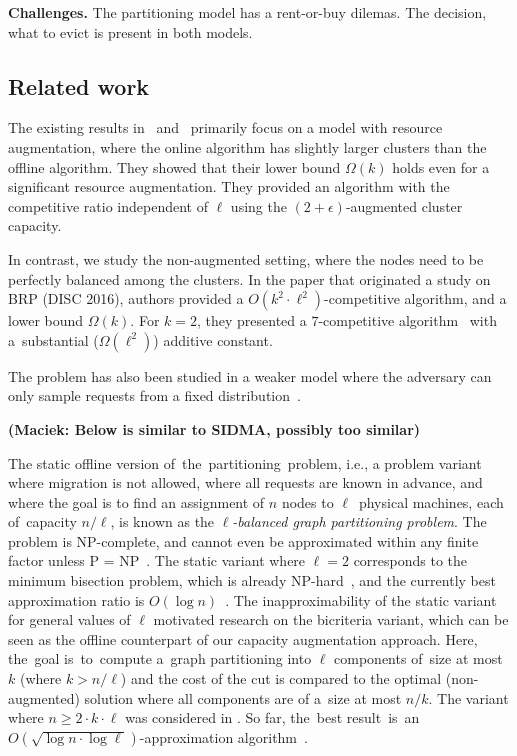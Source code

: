 \documentclass[manuscript,screen=true, review, anonymous]{acmart}
\newcommand\maciek[1]{\color{brown}\textbf{(Maciek: #1)}\color{black}}
\begin{document}
\noindent
\textbf{Challenges.}
The partitioning model has a rent-or-buy dilemas. The decision, what to evict is present in both models.



\subsection{Related work}


The existing results in~\cite{repartition-disc} and~\cite{sigmetrics19_partitioning} primarily focus on a model with resource augmentation, where  the online algorithm has slightly larger clusters than the offline algorithm.
They showed that their lower bound $\Omega(k)$ holds even for a significant resource augmentation.
They provided an algorithm with the competitive ratio independent of $\ell$ using the $(2+\epsilon)$-augmented cluster capacity.


In contrast, we study the non-augmented setting, where the nodes need to be perfectly balanced  among the clusters.
In the paper that originated a study on BRP \cite{repartition-disc} (DISC 2016), authors provided a $O(k^2 \cdot \ell^2)$-competitive algorithm, and a lower bound $\Omega(k)$.
For $k=2$, they presented a $7$-competitive algorithm~\cite{repartition-disc} with a~substantial ($\Omega(\ell^2)$) additive constant.


The problem has also been studied in a weaker
model where the adversary can only sample
requests from a fixed distribution~\cite{stochastic-ring}.

\maciek{Below is similar to SIDMA, possibly too similar}

The static offline version of~the~partitioning~problem, i.e., a problem variant where
migration is not allowed, where all requests are known in advance, and where
the goal is to find an assignment of $n$ nodes to $\ell$~physical machines, each of~capacity $n/\ell$, is known as the
\emph{$\ell$-balanced graph partitioning problem}. The problem is 
NP-complete, and cannot even be approximated within any finite factor unless P
= NP~\cite{AndRae06}.  The static
variant where $\ell = 2$ corresponds to the minimum bisection problem, which
is already NP-hard~\cite{GaJoSt76}, and 
the currently best approximation ratio is $O(\log n)$~\cite{SarVaz95,ArKaKa99,FeKrNi00,FeiKra02,KraFei06,Raec08}.
The inapproximability of the static variant for general values of $\ell$
motivated research on the bicriteria variant, which can be seen as the offline
counterpart of our capacity augmentation approach. Here, the~goal
is~to~compute a~graph partitioning into $\ell$ components of~size at most~$k$ (where $k > n/\ell$) and the cost of the cut is compared to the optimal (non-augmented)
solution where all components are of a~size at most $n/k$. The variant where
$n \geq 2 \cdot k \cdot \ell$ was considered in
\cite{LeMaTr90,SimTen97,EvNaRS00,EvNaRS99,KrNaSc09}. So far, the~best result~is~an~$O(\!\sqrt{\log n \cdot \log \ell})$-approximation algorithm~\cite{KrNaSc09}.
\end{document}
